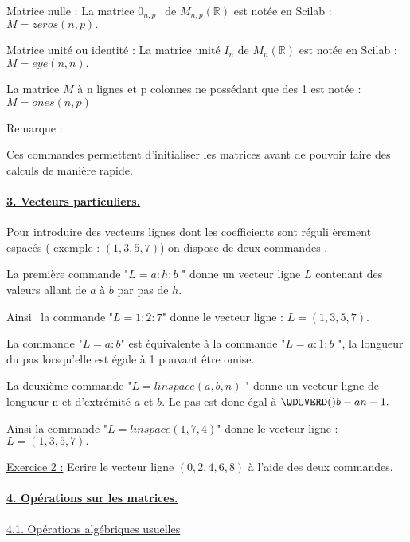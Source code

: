 \documentclass{article}
\begin{document}
Matrice nulle : La matrice $0_{n,p\text{ }}$ de $M_{n,p}(%
\mathbb{R}
)$ est not\'{e}e en Scilab : $M=zeros(n,p).$

Matrice unit\'{e} ou identit\'{e} : La matrice unit\'{e} $I_{n}$ de $M_{n}(%
\mathbb{R}
)$ est not\'{e}e en Scilab : $M=eye(n,n).$

La matrice $M$ \`{a} n lignes et p colonnes ne poss\'{e}dant que des 1 est
not\'{e}e : $M=ones(n,p)$

Remarque :

Ces commandes permettent d'initialiser les matrices avant de pouvoir faire
des calculs de mani\`{e}re rapide.

\paragraph{\protect\underline{3. Vecteurs particuliers.}}

Pour introduire des vecteurs lignes dont les coefficients sont r\'{e}guli%
\`{e}rement espac\'{e}s ( exemple : $\left( 1,3,5,7\right) $) on dispose de
deux commandes .

La premi\`{e}re commande "$L=a:h:b$ " donne un vecteur ligne $L$ contenant
des valeurs allant de $a$ \`{a} $b$ par pas de $h.$

Ainsi \ la commande "$L=1:2:7$" donne le vecteur ligne : $L=\left(
1,3,5,7\right) .$

La commande "$L=a:b$" est \'{e}quivalente \`{a} la commande "$L=a:1:b$ ", la
longueur du pas lorsqu'elle est \'{e}gale \`{a} 1 pouvant \^{e}tre omise.

La deuxi\`{e}me commande "$L=linspace(a,b,n)$ " donne un vecteur ligne de
longueur n et d'extr\'{e}mit\'{e} $a$ et $b.$ Le pas est donc \'{e}gal \`{a} 
$\QDOVERD( ) {b-a}{n-1}.$

Ainsi la commande "$L=linspace(1,7,4)$" donne le vecteur ligne : $L=\left(
1,3,5,7\right) .$

\underline{Exercice 2 :} Ecrire le vecteur ligne $\left( 0,2,4,6,8\right) $ 
\`{a} l'aide des deux commandes.

\paragraph{\protect\underline{4. Op\'{e}rations sur les matrices.}}

\underline{4.1. Op\'{e}rations alg\'{e}briques usuelles}
\end{document}
